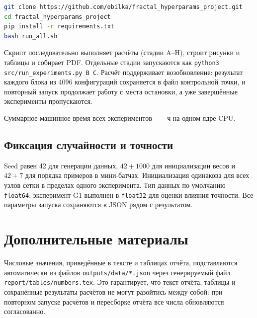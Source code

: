 \begin{lstlisting}[language=bash,caption={Полный цикл воспроизведения}]
git clone https://github.com/obilka/fractal_hyperparams_project.git
cd fractal_hyperparams_project
pip install -r requirements.txt
bash run_all.sh
\end{lstlisting}

Скрипт последовательно выполняет расчёты (стадии A--H), строит рисунки и
таблицы и собирает PDF. Отдельные стадии запускаются как
\texttt{python3 src/run\_experiments.py B C}. Расчёт поддерживает
возобновление: результат каждого блока из 4096 конфигураций сохраняется в
файл контрольной точки, и повторный запуск продолжает работу с места
остановки, а уже завершённые эксперименты пропускаются.

Суммарное машинное время всех экспериментов --- \TotalHours~ч на одном ядре
CPU.

\subsection{Фиксация случайности и точности}

Seed равен 42 для генерации данных, $42+1000$ для инициализации весов и
$42+7$ для порядка примеров в мини-батчах. Инициализация одинакова для всех
узлов сетки в пределах одного эксперимента. Тип данных по умолчанию
\texttt{float64}; эксперимент G1 выполнен в \texttt{float32} для оценки
влияния точности. Все параметры запуска сохраняются в JSON рядом с
результатом.

\section{Дополнительные материалы}

Числовые значения, приведённые в тексте и таблицах отчёта, подставляются
автоматически из файлов \texttt{outputs/data/*.json} через генерируемый файл
\texttt{report/tables/numbers.tex}. Это гарантирует, что текст отчёта,
таблицы и сохранённые результаты расчётов не могут разойтись между собой:
при повторном запуске расчётов и пересборке отчёта все числа обновляются
согласованно.

